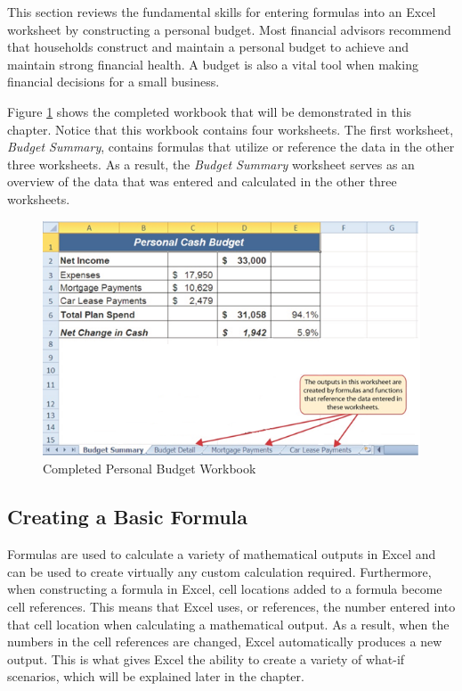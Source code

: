 This section reviews the fundamental skills for entering formulas into an Excel worksheet by constructing a personal budget. Most financial advisors recommend that households construct and maintain a personal budget to achieve and maintain strong financial health. A budget is also a vital tool when making financial decisions for a small business.

Figure \ref{02:fig01} shows the completed workbook that will be demonstrated in this chapter. Notice that this workbook contains four worksheets. The first worksheet, \textit{Budget Summary}, contains formulas that utilize or reference the data in the other three worksheets. As a result, the \textit{Budget Summary} worksheet serves as an overview of the data that was entered and calculated in the other three worksheets.

\begin{figure}[H]
	\centering
	\includegraphics[width=\maxwidth{.95\linewidth}]{gfx/ch02_fig01}
	\caption{Completed Personal Budget Workbook}
	\label{02:fig01}
\end{figure}

\subsection{Creating a Basic Formula}

Formulas are used to calculate a variety of mathematical outputs in Excel and can be used to create virtually any custom calculation required. Furthermore, when constructing a formula in Excel, cell locations added to a formula become cell references. This means that Excel uses, or references, the number entered into that cell location when calculating a mathematical output. As a result, when the numbers in the cell references are changed, Excel automatically produces a new output. This is what gives Excel the ability to create a variety of what-if scenarios, which will be explained later in the chapter.

